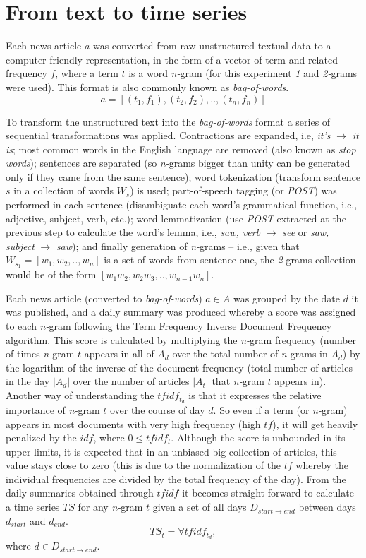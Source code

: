 \documentclass{article}
\begin{document}
\section{From text to time series}
Each news article \(a\) was converted from raw unstructured textual data to a computer-friendly representation, in the form of a vector of term and related frequency \(f\), where a term \(t\) is a word \textit{n-}gram (for this experiment \textit{1} and \textit{2-}grams were used). This format is also commonly known as \textit{bag-of-words}.
\[a=[(t_1,f_1),(t_2,f_2),..,(t_n,f_n)]\]
\par
To transform the unstructured text into the \textit{bag-of-words} format a series of sequential transformations was applied. Contractions are expanded, i.e, \textit{it's} \(\to\) \textit{it is}; most common words in the English language are removed (also known as \textit{stop words}); sentences are separated (so \textit{n-}grams bigger than unity can be generated only if they came from the same sentence); word tokenization (transform sentence \(s\) in a collection of words \(W_s\)) is used; part-of-speech tagging (or \textit{POST}) was performed in each sentence (disambiguate each word's grammatical function, i.e., adjective, subject, verb, etc.); word lemmatization (use \textit{POST} extracted at the previous step to calculate the word's lemma, i.e., \textit{saw, verb} \(\to\) \textit{see} or \textit{saw, subject} \(\to\) \textit{saw}); and finally generation of \textit{n-}grams -- i.e., given that \(W_{s_1}=[w_1,w_2,..,w_n]\) is a set of words from sentence one, the \textit{2-}grams collection would be of the form \([w_1 w_2,w_2 w_3,..,w_{n-1} w_n]\).
\par
Each news article (converted to \textit{bag-of-words}) \(a \in A\) was grouped by the date \(d\) it was published, and a daily summary was produced whereby a score was assigned to each \textit{n-}gram following the Term Frequency Inverse Document Frequency algorithm. This score is calculated by multiplying the \textit{n-}gram frequency (number of times \textit{n-}gram \(t\) appears in all of \(A_d\) over the total number of \textit{n-}grams in \(A_d\)) by the logarithm of the inverse of the document frequency (total number of articles in the day \(\vert A_d \vert\) over the number of articles \(\vert A_t \vert\) that \textit{n-}gram \(t\) appears in). Another way of understanding the \(tfidf_{t_d}\) is that it expresses the relative importance of \textit{n-}gram \(t\) over the course of day \(d\). So even if a term (or \textit{n-}gram) appears in most documents with very high frequency (high \(tf\)), it will get heavily penalized by the \(idf\), where \(0 \leq tfidf_t\). Although the score is unbounded in its upper limits, it is expected that in an unbiased big collection of articles, this value stays close to zero (this is due to the normalization of the \(tf\) whereby the individual frequencies are divided by the total frequency of the day).
From the daily summaries obtained through \(tfidf\) it becomes straight forward to calculate a time series \(TS\) for any \textit{n-}gram \(t\) given a set of all days \(D_{start \to end}\) between days \(d_{start}\) and \(d_{end}\).
\[TS_t=\forall{tfidf_{t_d}},\] where \(d \in D_{start \to end}\).
\end{document}
